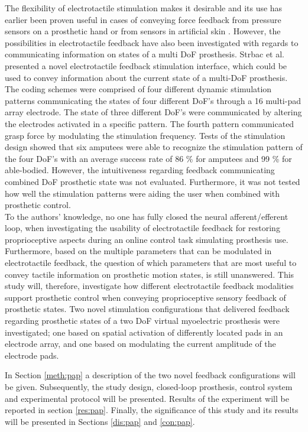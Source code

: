 %
The flexibility of electrotactile stimulation makes it desirable and its use has earlier been proven useful in cases of conveying force feedback from pressure sensors on a prosthetic hand or from sensors in artificial skin \cite{Hartmann2014,Franceschi2015}. However, the possibilities in electrotactile feedback have also been investigated with regards to communicating information on states of a multi DoF prosthesis. Strbac et al. \cite{Strbac2016} presented a novel electrotactile feedback stimulation interface, which could be used to convey information about the current state of a multi-DoF prosthesis. The coding schemes were comprised of four different dynamic stimulation patterns communicating the states of four different DoF's through a 16 multi-pad array electrode. The state of three different DoF's were communicated by altering the electrodes activated in a specific pattern. The fourth pattern communicated grasp force by modulating the stimulation frequency. Tests of the stimulation design showed that six amputees were able to recognize the stimulation pattern of the four DoF's with an average success rate of 86 \% for amputees and 99 \% for able-bodied. \cite{Strbac2016} However, the intuitiveness regarding feedback communicating combined DoF prosthetic state was not evaluated. Furthermore, it was not tested how well the stimulation patterns were aiding the user when combined with prosthetic control.  \\   
%
To the authors' knowledge, no one has fully closed the neural afferent/efferent loop, when investigating the usability of electrotactile feedback for restoring proprioceptive aspects during an online control task simulating prosthesis use. Furthermore, based on the multiple parameters that can be modulated in electrotactile feedback, the question of which parameters that are most useful to convey tactile information on prosthetic motion states, is still unanswered. This study will, therefore, investigate how different electrotactile feedback modalities support prosthetic control when conveying proprioceptive sensory feedback of prosthetic states. Two novel stimulation configurations that delivered feedback regarding prosthetic states of a two DoF virtual myoelectric prosthesis were investigated; one based on spatial activation of differently located pads in an electrode array, and one based on modulating the current amplitude of the electrode pads.

In Section \ref{meth:pap} a description of the two novel feedback configurations will be given. Subsequently, the study design, closed-loop prosthesis, control system and experimental protocol will be presented. Results of the experiment will be reported in section \ref{res:pap}. Finally, the significance of this study and its results will be presented in Sections \ref{dis:pap} and \ref{con:pap}. 

















